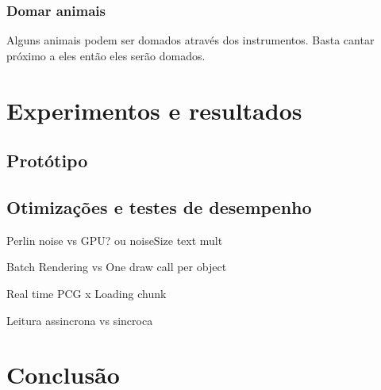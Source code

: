 \documentclass[12pt, 
openright, 
oneside, 
a4paper,    
brazil]{facom-ufu-abntex2}
\begin{document}
\subsection{Domar animais}
Alguns animais podem ser domados através dos instrumentos. Basta cantar próximo a eles então eles serão domados.


\chapter{Experimentos e resultados}
\label{sec:experim}

\section{Protótipo}

\section{Otimizações e testes de desempenho}

Perlin noise  vs GPU? ou noiseSize text mult

Batch Rendering vs One draw call per object

Real time PCG x Loading chunk

Leitura assincrona vs sincroca




\chapter{Conclusão}
\label{sec:conclus}









\postextual




\end{document}
